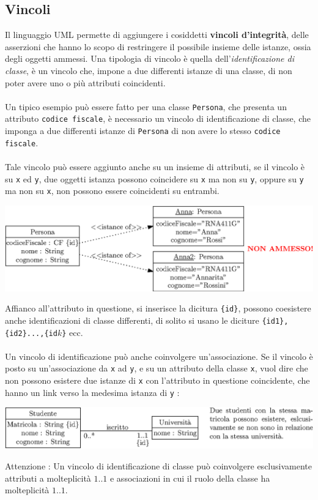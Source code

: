 \documentclass[12pt, letterpaper]{article}
\newcommand{\code}[1]{\colorbox{light-gray}{\texttt{#1}}}
\newcommand{\acc}{\\\hphantom{}\\}
\begin{document}
\subsection{Vincoli}
Il linguaggio UML permette di aggiungere i cosiddetti \textbf{vincoli d'integrità}, delle asserzioni che hanno lo
scopo di restringere il possibile insieme delle istanze, ossia degli oggetti ammessi. Una tipologia di vincolo è
quella dell'\textit{identificazione di classe}, è un vincolo che, impone a due differenti istanze di una classe,
di non poter avere uno o più attributi coincidenti.\acc
Un tipico esempio può essere fatto per una classe \code{Persona}, che presenta un attributo \code{codice fiscale},
è necessario un vincolo di identificazione di classe, che imponga a due differenti istanze di \code{Persona} di non
avere lo stesso \code{codice fiscale}. \acc Tale vincolo può essere aggiunto anche su un insieme di attributi,
se il vincolo è su \code{x} ed \code{y}, due oggetti istanza possono coincidere su \code{x} ma non su \code{y}, oppure
su \code{y} ma non su \code{x}, non possono essere coincidenti su entrambi.\begin{center}
    \includegraphics[width=\textwidth ]{images/identificazione.eps}
\end{center}
Affianco all'attributo in questione, si inserisce la dicitura \code{\{id\}}, possono coesistere anche identificazioni
di classe differenti, di solito si usano le diciture \code{\{id1\}, \{id2\}...,\{id$k$\}} ecc.\acc Un vincolo di
identificazione può anche coinvolgere un'associazione. Se il vincolo è posto su un'associazione da
\code{x} ad \code{y}, e su un attributo
della classe \code{x},
vuol dire che non possono esistere due istanze di \code{x} con l'attributo in questione coincidente, che hanno un
link verso la medesima istanza di \code{y} :\begin{center}
    \includegraphics[width=\textwidth ]{images/vincoloAss.eps}
\end{center}
Attenzione : Un vincolo di identificazione di classe può coinvolgere esclusivamente attributi a molteplicità
$1..1$ e associazioni in cui il ruolo della classe ha molteplicità $1..1$.
\end{document}
